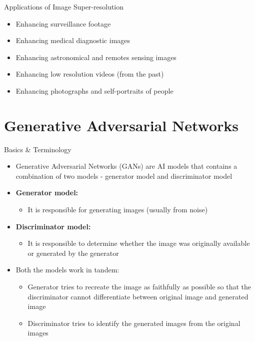 \documentclass{beamer}
\begin{document}
	\begin{frame}{Applications of Image Super-resolution}
		\begin{itemize}
			\item Enhancing surveillance footage
			\item Enhancing medical diagnostic images
			\item Enhancing astronomical and remotes sensing images
			\item Enhancing low resolution videos (from the past)
			\item Enhancing photographs and self-portraits of people
		\end{itemize}
	\end{frame}


\section{Generative Adversarial Networks}
	\begin{frame}{Basics \& Terminology}
		\begin{itemize}
			\item Generative Adversarial Networks (GANs) are AI models that contains a combination of two  models - generator model and discriminator model
			\item \textbf{Generator model:}
			\begin{itemize}
				\item It is responsible for generating images (usually from noise)
			\end{itemize}
			\item \textbf{Discriminator model:}
			\begin{itemize}
				\item It is responsible to determine whether the image was originally available or generated by the generator 
			\end{itemize}
			\item Both the models work in tandem:
			\begin{itemize}
				\item Generator tries to recreate the image as faithfully as possible so that the discriminator cannot differentiate between original image and generated image
				\item Discriminator tries to identify the generated images from the original images 
			\end{itemize}
		\end{itemize}
	\end{frame}
\end{document}
